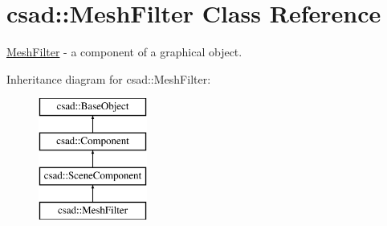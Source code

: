 \hypertarget{classcsad_1_1_mesh_filter}{\section{csad\-:\-:Mesh\-Filter Class Reference}
\label{classcsad_1_1_mesh_filter}
}


\hyperlink{classcsad_1_1_mesh_filter}{Mesh\-Filter} -\/ a component of a graphical object.  


Inheritance diagram for csad\-:\-:Mesh\-Filter\-:\begin{figure}[H]
\begin{center}
\leavevmode
\includegraphics[height=4.000000cm]{classcsad_1_1_mesh_filter}
\end{center}
\end{figure}
